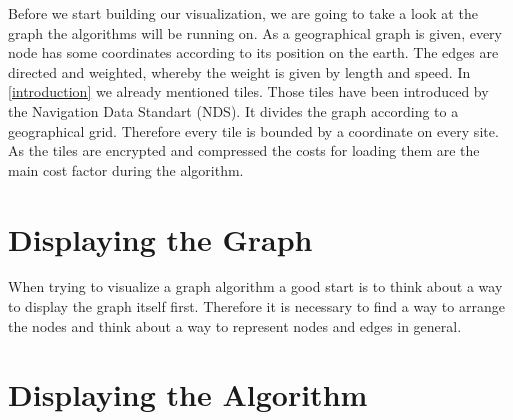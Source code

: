 \documentclass
[
	paper = a4,
    pagesize,
	12 pt,
	oneside,                       %
    open = right,
	DIV = calc,
	BCOR = 0 mm,                   %
	bibtotoc
]
{scrbook}
\begin{document}
Before we start building our visualization, we are going to take a look at the graph the algorithms will be running on.
As a geographical graph is given, every node has some coordinates according to its position on the earth.
The edges are directed and weighted, whereby the weight is given by length and speed.
In \ref{introduction} we already mentioned tiles.
Those tiles have been introduced by the Navigation Data Standart (NDS). It divides the graph according to a geographical grid.
Therefore every tile is bounded by a coordinate on every site.
As the tiles are encrypted and compressed the costs for loading them are the main cost factor during the algorithm.



\section{Displaying the Graph} \label{graph}


When trying to visualize a graph algorithm a good start is to think about a way to display the graph itself first.
Therefore it is necessary to find a way to arrange the nodes and think about a way to represent nodes and edges in general.



\section{Displaying the Algorithm}
\end{document}

